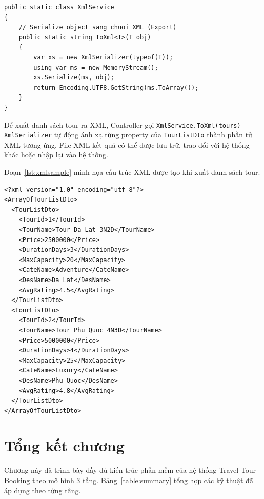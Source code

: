 \begin{lstlisting}[style=csharp,
  caption={XmlService -- Export và Import dữ liệu XML},
  label={lst:xmlservice}]
public static class XmlService
{
    // Serialize object sang chuoi XML (Export)
    public static string ToXml<T>(T obj)
    {
        var xs = new XmlSerializer(typeof(T));
        using var ms = new MemoryStream();
        xs.Serialize(ms, obj);
        return Encoding.UTF8.GetString(ms.ToArray());
    }
}
\end{lstlisting}

Để xuất danh sách tour ra XML, Controller gọi
\texttt{XmlService.ToXml(tours)} -- \texttt{XmlSerializer}
tự động ánh xạ từng property của \texttt{TourListDto} thành
phần tử XML tương ứng. File XML kết quả có thể được lưu
trữ, trao đổi với hệ thống khác hoặc nhập lại vào hệ thống.

Đoạn~\ref{lst:xmlsample} minh họa cấu trúc XML được tạo
khi xuất danh sách tour.

\begin{lstlisting}[style=sql,
  caption={Cấu trúc file XML xuất từ hệ thống},
  label={lst:xmlsample}]
<?xml version="1.0" encoding="utf-8"?>
<ArrayOfTourListDto>
  <TourListDto>
    <TourId>1</TourId>
    <TourName>Tour Da Lat 3N2D</TourName>
    <Price>2500000</Price>
    <DurationDays>3</DurationDays>
    <MaxCapacity>20</MaxCapacity>
    <CateName>Adventure</CateName>
    <DesName>Da Lat</DesName>
    <AvgRating>4.5</AvgRating>
  </TourListDto>
  <TourListDto>
    <TourId>2</TourId>
    <TourName>Tour Phu Quoc 4N3D</TourName>
    <Price>5000000</Price>
    <DurationDays>4</DurationDays>
    <MaxCapacity>25</MaxCapacity>
    <CateName>Luxury</CateName>
    <DesName>Phu Quoc</DesName>
    <AvgRating>4.8</AvgRating>
  </TourListDto>
</ArrayOfTourListDto>
\end{lstlisting}

\section{Tổng kết chương}\label{Sec3.8}

Chương này đã trình bày đầy đủ kiến trúc phần mềm của hệ
thống Travel Tour Booking theo mô hình 3 tầng. Bảng~\ref{table:summary}
tổng hợp các kỹ thuật đã áp dụng theo từng tầng.

